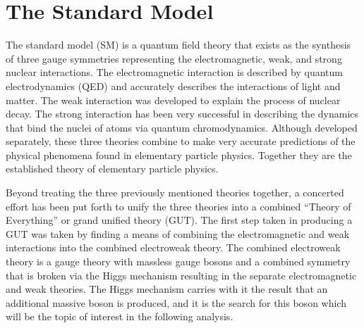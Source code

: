 \section{The Standard Model}
\label{sec:standardmodel}
The standard model (SM) is a quantum field theory that exists as the synthesis of three gauge symmetries representing the electromagnetic, weak, and strong nuclear interactions.
The electromagnetic interaction is described by quantum electrodynamics (QED) and accurately describes the interactions of light and matter. %
The weak interaction was developed to explain the process of nuclear decay.
The strong interaction has been very successful in describing the dynamics that bind the nuclei of atoms via quantum chromodynamics.
Although developed separately, these three theories combine to make very accurate predictions of the physical phenomena found in elementary particle physics. 
Together they are the established theory of elementary particle physics.

Beyond treating the three previously mentioned theories together, a concerted effort has been put forth to unify the three theories into a combined ``Theory of Everything'' or grand unified theory (GUT).
The first step taken in producing a GUT was taken by finding a means of combining the electromagnetic and weak interactions into the combined electroweak theory. %
The combined electroweak theory is a gauge theory with massless gauge bosons and a combined symmetry that is broken via the Higgs mechanism resulting in the separate electromagnetic and weak theories.
The Higgs mechanism carries with it the result that an additional massive boson is produced, and it is the search for this boson which will be the topic of interest in the following analysis.

%
%







